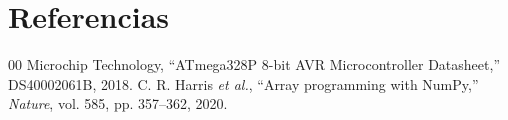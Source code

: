 \documentclass[conference]{IEEEtran}
\begin{document}
\section{Referencias}
\begin{thebibliography}{00}
 Microchip Technology, ``ATmega328P 8-bit AVR Microcontroller Datasheet,'' DS40002061B, 2018.
 C. R. Harris \textit{et al.}, ``Array programming with NumPy,'' \textit{Nature}, vol. 585, pp. 357--362, 2020.
\end{thebibliography}
\end{document}

